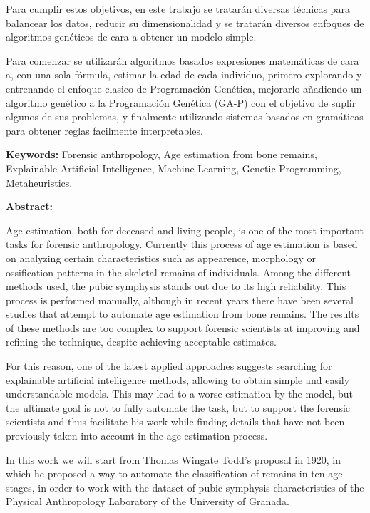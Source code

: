 Para cumplir estos objetivos, en este trabajo se tratarán diversas técnicas para balancear los datos, reducir su dimensionalidad y se tratarán diversos enfoques de algoritmos genéticos de cara a obtener un modelo simple.

Para comenzar se utilizarán algoritmos basados expresiones matemáticas de cara a, con una sola fórmula, estimar la edad de cada individuo, primero explorando y entrenando el enfoque clasico de Programación Genética, mejorarlo añadiendo un algoritmo genético a la Programación Genética (GA-P) con el objetivo de suplir algunos de sus problemas, y finalmente utilizando sistemas basados en gramáticas para obtener reglas facilmente interpretables.

\newpage


\begin{center}
	{\large\textbf{\thetitleEN}}


	\theauthor
\end{center}

\textbf{Keywords:} Forensic anthropology, Age estimation from bone remains, Explainable Artificial Intelligence,
Machine Learning, Genetic Programming, Metaheuristics.

\textbf{Abstract:}

Age estimation, both for deceased and living people, is one of the most important tasks for forensic anthropology. Currently this process of age estimation is based on analyzing certain characteristics such as appearence, morphology or ossification patterns in the skeletal remains of individuals. Among the different methods used, the pubic symphysis stands out due to its high reliability. This process is performed manually, although in recent years there have been several studies that attempt to automate age estimation from bone remains. The results of these methods are too complex to support forensic scientists at improving and refining the technique, despite achieving acceptable estimates.

For this reason, one of the latest applied approaches suggests searching for explainable artificial intelligence methods, allowing to obtain simple and easily understandable models. This may lead to a worse estimation by the model, but the ultimate goal is not to fully automate the task, but to support the forensic scientists and thus facilitate his work while finding details that have not been previously taken into account in the age estimation process.

In this work we will start from Thomas Wingate Todd's proposal in 1920, in which he proposed a way to automate the classification of remains in ten age stages, in order to work with the dataset of pubic symphysis characteristics of the Physical Anthropology Laboratory of the University of Granada.

